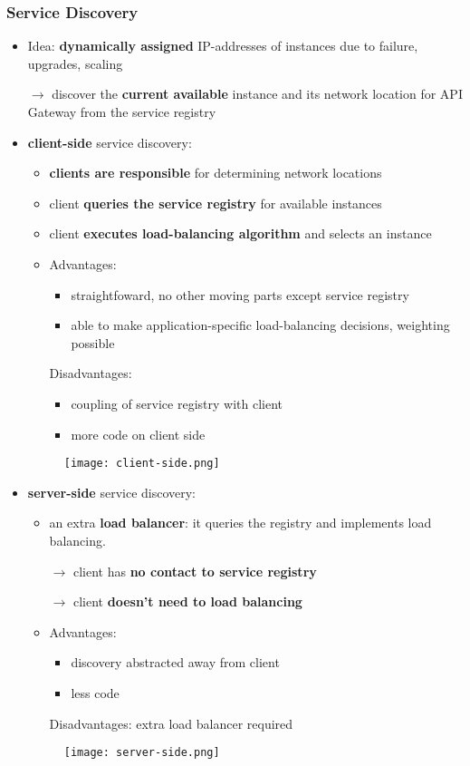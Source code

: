 \subsubsection{Service Discovery}
\begin{itemize}
	\item Idea: \textbf{dynamically assigned} IP-addresses of instances due to failure, upgrades, scaling
	
	$\rightarrow$ discover the \textbf{current available} instance and its network location for API Gateway from the service registry
	
	\item \textbf{client-side} service discovery:
	\begin{itemize}
		\item \textbf{clients are responsible} for determining network locations
		\item client \textbf{queries the service registry} for available instances
		\item client \textbf{executes load-balancing algorithm} and selects an instance
		\item Advantages:
		\begin{itemize}
			\item straightfoward, no other moving parts except service registry
			\item able to make application-specific load-balancing decisions, weighting possible
		\end{itemize}
		Disadvantages:
		\begin{itemize}
			\item coupling of service registry with client
			\item more code on client side
		\end{itemize}
	\end{itemize}
	\begin{figure}[H]
		\centering
		\texttt{[image: client-side.png]}
	\end{figure}
	
	
	\item \textbf{server-side} service discovery:
	\begin{itemize}
		\item an extra \textbf{load balancer}: it queries the registry and implements load balancing.
		
		$\rightarrow$ client has \textbf{no contact to service registry}
		
		$\rightarrow$ client \textbf{doesn't need to load balancing}
		
		\item Advantages:
		\begin{itemize}
			\item discovery abstracted away from client
			\item less code
		\end{itemize}
		Disadvantages: extra load balancer required
	\end{itemize}
	\begin{figure}[H]
		\centering
		\texttt{[image: server-side.png]}
	\end{figure}
\end{itemize}

